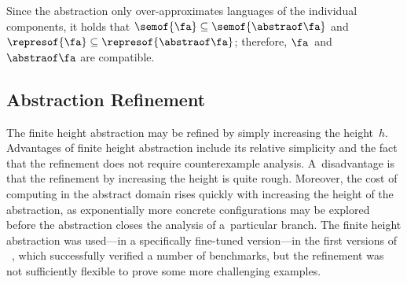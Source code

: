 %
Since the abstraction only over-approximates languages of the individual components,
it holds that 
$\semof{\fa}\subseteq\semof{\abstraof \fa}$
and
$\represof{\fa}\subseteq\represof{\abstraof \fa }$; therefore, $\fa$~and $\abstraof \fa$ are compatible. 
%

\subsection{Abstraction Refinement}\label{sec:label}

The finite height abstraction may be refined by simply increasing the
height~$h$.
%
Advantages of finite height abstraction include its relative simplicity and the
fact that the refinement does not require counterexample analysis.  
%
A~disadvantage is 
%
%
%
that the refinement by increasing the height is quite rough.
Moreover, the cost of computing in the abstract domain rises quickly with increasing
the height of the abstraction, as exponentially more concrete configurations may be explored
before the abstraction closes the analysis of a~particular branch.
%
%
The finite height abstraction was used---in a specifically fine-tuned
version---in the first versions of \forester{}~\cite{habermehl:forest,boxes13}, which
successfully verified a number of benchmarks, but the refinement was not
sufficiently flexible to prove some more challenging examples. 

